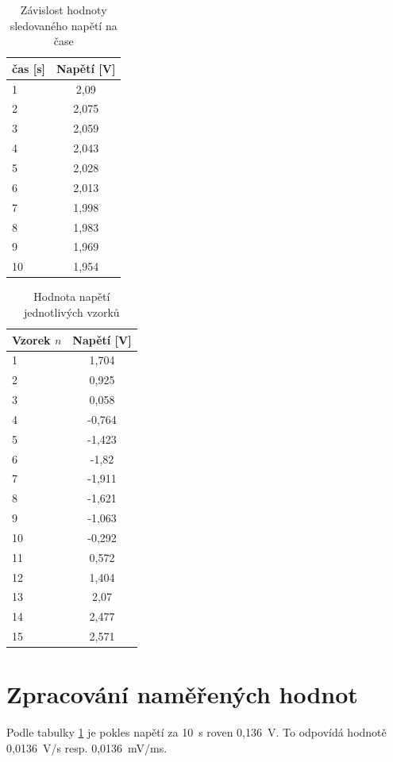 \documentclass[a4paper,12pt]{article}   %
\begin{document}
\begin{table}[h!]
  \centering  
  \begin{tabular}{|l|c|}
    \hline
    čas [s]&Napětí [V]\\\hline\hline
    1&2,09  \\\hline
    2&2,075 \\\hline
    3&2,059 \\\hline
    4&2,043 \\\hline
    5&2,028 \\\hline
    6&2,013 \\\hline
    7&1,998 \\\hline
    8&1,983 \\\hline
    9&1,969 \\\hline
    10&1,954 \\\hline
  \end{tabular}
  \caption{Závislost hodnoty sledovaného napětí na čase}
  \label{tab:sledovane}  
\end{table}

\begin{table}[h!]
  \centering
  \begin{tabular}{|l|c|}
    \hline
    Vzorek $n$&Napětí [V] \\\hline\hline
    1&1,704\\\hline
    2&0,925\\\hline
    3&0,058\\\hline
    4&-0,764\\\hline
    5&-1,423\\\hline
    6&-1,82\\\hline
    7&-1,911\\\hline
    8&-1,621\\\hline
    9&-1,063\\\hline
    10&-0,292\\\hline
    11&0,572\\\hline
    12&1,404\\\hline
    13&2,07\\\hline
    14&2,477\\\hline
    15&2,571\\\hline
  \end{tabular}
  \caption{Hodnota napětí jednotlivých vzorků}
  \label{tab:vzorky}  
\end{table}



\section{Zpracování naměřených hodnot}
\label{chap:zpracovani_hodnot}
Podle tabulky \ref{tab:sledovane} je pokles napětí za 10~s roven 0,136~V. To odpovídá hodnotě 0,0136~V/s resp. 0,0136~mV/ms.
\end{document}

